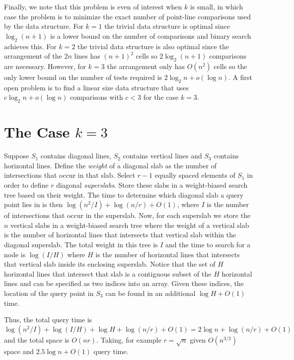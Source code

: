 \documentclass{article}
\begin{document}
Finally, we note that this problem is even of interest when $k$ is
small, in which case the problem is to minimize the exact number of
point-line comparisons used by the data structure.  For $k=1$ the
trivial data structure is optimal since $\log_2 (n+1)$ is a lower
bound on the number of comparisons and binary search achieves this.
For $k=2$ the trivial data structure is also optimal since the
arrangement of the $2n$ lines has $(n+1)^2$ cells so $2\log_2 (n+1)$
comparisons are necessary.  However, for $k=3$ the arrangement only
has $O(n^2)$ cells so the only lower bound on the number of tests
required is $2\log_2 n + o(\log n)$.  A first open problem is to find
a linear size data structure that uses $c\log_2 n + o(\log n)$
comparisons with $c<3$ for the case $k=3$. 

\section{The Case $k=3$}

Suppose $S_1$ contains diagonal lines, $S_2$ contains vertical lines
and $S_3$ contains horizontal lines. Define the \emph{weight} of a
diagonal slab as the number of intersections that occur in that slab.
Select $r-1$ equally spaced elements of $S_1$ in order to define $r$
diagonal \emph{superslabs}.  Store these slabs in a weight-biased
search tree based on their weight.  The time to determine which
diagonal slab a query point lies in is then $\log (n^2/I) + \log (n/r)
+ O(1)$, where $I$ is the number of intersections that occur in the
superslab.  Now, for each superslab we store the $n$ vertical slabs in
a weight-biased search tree where the weight of a vertical slab is the
number of horizontal lines that intersects that vertical slab within
the diagonal superslab.  The total weight in this tree is $I$ and the
time to search for a node is $\log (I/H)$ where $H$ is the number of
horizontal lines that intersects that vertical slab inside its
enclosing superslab. Notice that the set of $H$ horizontal lines that
intersect that slab is a contiguous subset of the $H$ horizontal lines
and can be specified as two indices into an array.  Given these
indices, the location of the query point in $S_3$ can be found in an
additional $\log H + O(1)$ time.

Thus, the total query time is $\log (n^2/I) + \log(I/H) + \log H +
\log (n/r)+O(1)= 2\log n+\log(n/r)+O(1)$ and the total space is
$O(nr)$.  Taking, for example $r=\sqrt{n}$ given $O(n^{3/2})$ space
and $2.5\log n + O(1)$ query time.




\end{document}
